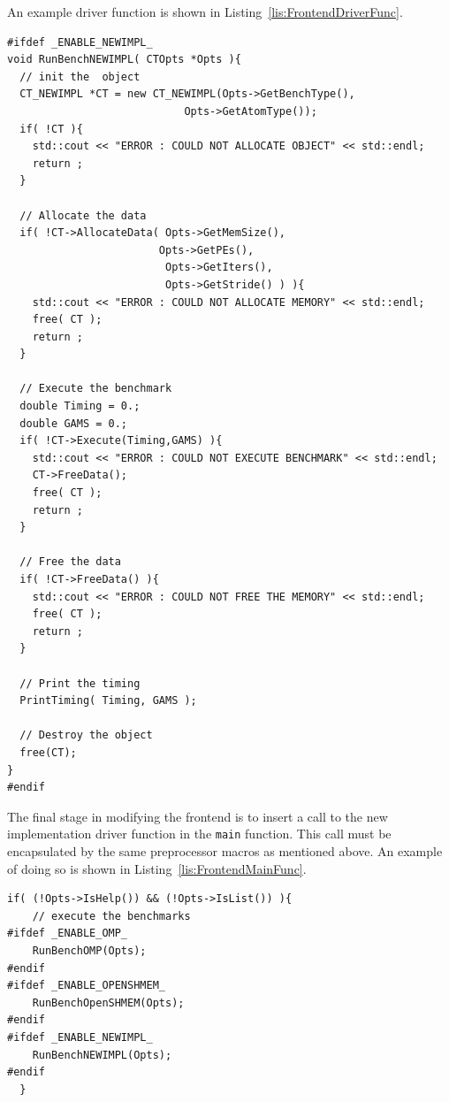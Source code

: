 \documentclass{article}
\begin{document}
An example driver function is shown in Listing~\ref{lis:FrontendDriverFunc}.  

\clearpage
\vspace{0.125in}
\begin{lstlisting}[frame=single,style=base,caption={Frontend Driver Function},captionpos=b,label={lis:FrontendDriverFunc}]
#ifdef _ENABLE_NEWIMPL_
void RunBenchNEWIMPL( CTOpts *Opts ){
  // init the  object
  CT_NEWIMPL *CT = new CT_NEWIMPL(Opts->GetBenchType(),
                          	Opts->GetAtomType());
  if( !CT ){
    std::cout << "ERROR : COULD NOT ALLOCATE OBJECT" << std::endl;
    return ;
  }

  // Allocate the data
  if( !CT->AllocateData( Opts->GetMemSize(),
                       	Opts->GetPEs(),
                         Opts->GetIters(),
                         Opts->GetStride() ) ){
    std::cout << "ERROR : COULD NOT ALLOCATE MEMORY" << std::endl;
    free( CT );
    return ;
  }

  // Execute the benchmark
  double Timing = 0.;
  double GAMS = 0.;
  if( !CT->Execute(Timing,GAMS) ){
    std::cout << "ERROR : COULD NOT EXECUTE BENCHMARK" << std::endl;
    CT->FreeData();
    free( CT );
    return ;
  }

  // Free the data
  if( !CT->FreeData() ){
    std::cout << "ERROR : COULD NOT FREE THE MEMORY" << std::endl;
    free( CT );
    return ;
  }

  // Print the timing
  PrintTiming( Timing, GAMS );

  // Destroy the object
  free(CT);
}
#endif
\end{lstlisting}

The final stage in modifying the frontend is to insert a call to the new 
implementation driver function in the \texttt{main} function.  This call 
must be encapsulated by the same preprocessor macros as mentioned 
above.  An example of doing so is shown in Listing~\ref{lis:FrontendMainFunc}.  

\clearpage
\vspace{0.125in}
\begin{lstlisting}[frame=single,style=base,caption={Frontend Main Modifications},captionpos=b,label={lis:FrontendMainFunc}]
 if( (!Opts->IsHelp()) && (!Opts->IsList()) ){
    // execute the benchmarks
#ifdef _ENABLE_OMP_
    RunBenchOMP(Opts);
#endif
#ifdef _ENABLE_OPENSHMEM_
    RunBenchOpenSHMEM(Opts);
#endif
#ifdef _ENABLE_NEWIMPL_
    RunBenchNEWIMPL(Opts);
#endif
  }
\end{lstlisting}


\clearpage
%
%


\end{document}
